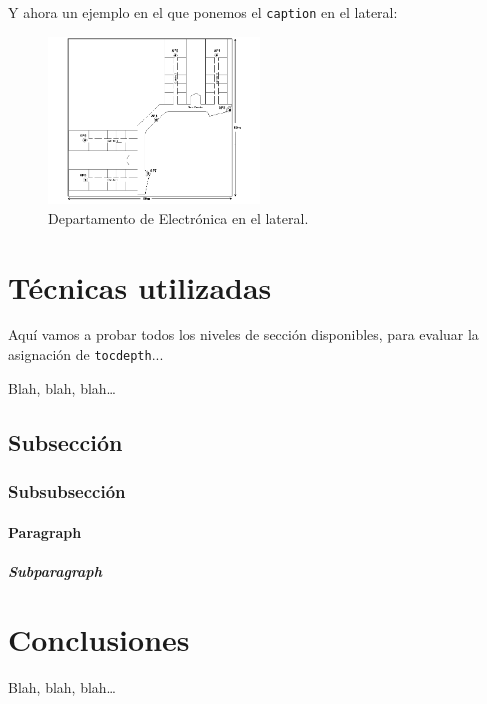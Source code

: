 \documentclass[spanish,openright]{book}
\begin{document}
Y ahora un ejemplo en el que ponemos el \texttt{caption} en el lateral:

\begin{figure}
\centering
\includegraphics[width=0.5\textwidth]{Figure1}
\caption{Departamento de Electrónica en el lateral.}
\end{figure}



\section{Técnicas utilizadas}
\label{sec:tecnicas-utilizadas}

Aquí vamos a probar todos los niveles de sección disponibles, para
evaluar la asignación de \texttt{tocdepth}...

Blah, blah, blah\ldots


\subsection{Subsección}
\label{sec:subseccion}


\subsubsection{Subsubsección}
\label{sec:subsubseccion}

\paragraph{Paragraph}
\label{sec:paragraph-1}


\subparagraph{Subparagraph}
\label{sec:subparagraph}



\section{Conclusiones}
\label{sec:conclusiones-teoria}

Blah, blah, blah\ldots
\end{document}
